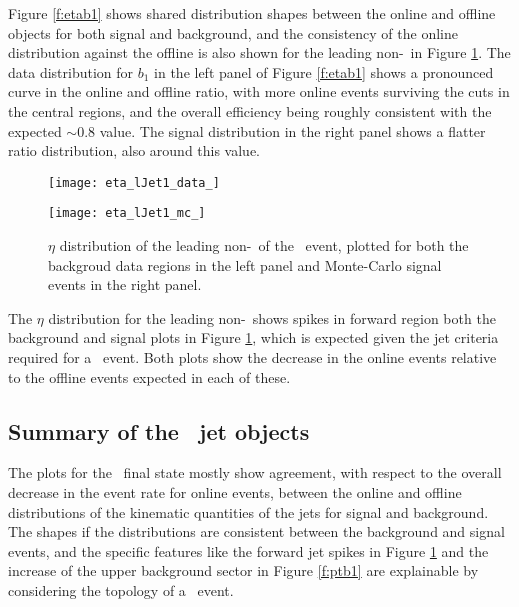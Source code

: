 	Figure \ref{f:etab1} shows shared distribution shapes between the online and offline objects for both signal and background, and the consistency of the online distribution against the offline is also shown for the leading non-\bjet\ in Figure \ref{f:etaj1}. The data distribution for $b_1$ in the left panel of Figure \ref{f:etab1} shows a pronounced curve in the online and offline ratio, with more online events surviving the cuts in the central regions, and the overall efficiency being roughly consistent with the expected $\sim0.8$ value. The signal distribution in the right panel shows a flatter ratio distribution, also around this value.

		\begin{figure}[h]
			\centering
			\begin{minipage}[h]{0.48\linewidth}
				\texttt{[image: eta\_lJet1\_data\_]}
			\end{minipage}
			\quad
			\begin{minipage}[h]{0.48\linewidth}
				\texttt{[image: eta\_lJet1\_mc\_]}
			\end{minipage}
			\label{f:etaj1}
			\caption[$\eta$ distribution of the leading non-\bjet\ of the \VBFHBB\ event]{$\eta$ distribution of the leading non-\bjet\ of the \VBFHBB\ event, plotted for both the backgroud data regions in the left panel and Monte-Carlo signal events in the right panel.}
		\end{figure}

		The $\eta$ distribution for the leading non-\bjet\ shows spikes in  forward region  both the background and signal plots in Figure \ref{f:etaj1}, which is expected given the jet criteria required for a \VBFHBB\ event. Both plots show the decrease in the online events relative to the offline events expected in each of these.

	\subsection{Summary of the \VBFHBB\ jet objects}

	The plots for the \VBFHBB\ final state mostly show agreement, with respect to the overall decrease in the event rate for online events, between the online and offline distributions of the kinematic quantities of the jets for signal and background. The shapes if the distributions are consistent between the background and signal events, and the specific features like the forward jet spikes in Figure \ref{f:etaj1} and the increase \pt of the upper background sector in Figure \ref{f:ptb1} are explainable by considering the topology of a \VBFHBB\ event.

